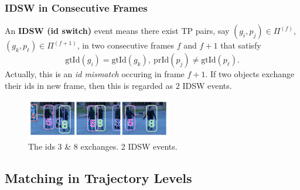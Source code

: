 \documentclass[slidetop, mathserif]{beamer}
\begin{document}
\begin{frame}
	\frametitle{IDSW in Consecutive Frames}
			
	An {\bf IDSW (id switch)} event means there exist TP pairs, say $(g_i, p_j)\in\Pi^{(f)}$,
	$(g_k, p_\ell)\in\Pi^{(f+1)}$, in two consecutive frames
	$f$ and $f+1$ that satisfy
	\[
		\text{gtId}(g_i) = \text{gtId}(g_k),\ 
		\text{prId}(p_j) \neq \text{gtId}(p_\ell).
	\]
	Actually, this is an \emph{id mismatch} occuring in frame $f+1$.
	If two objects exchange their ids in new frame, then this is regarded as $2$
	IDSW events.
	\begin{figure}
		\includegraphics[width=180pt]{pics/fig3.png}
		\caption{The ids 3 \& 8 exchanges. 2 IDSW events.}
	\end{figure}
			    
\end{frame}

\subsection{Matching in Trajectory Levels}
\end{document}
